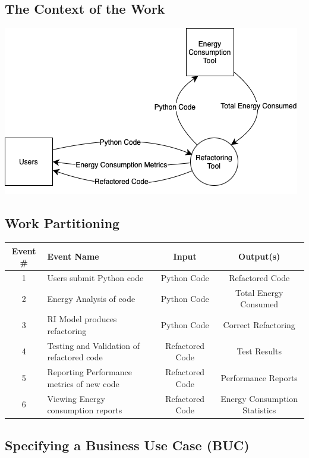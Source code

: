 \documentclass[12pt]{article}
\begin{document}
\subsection{The Context of the Work}

\includegraphics[scale=0.5]{../images/WorkContextModel.png}

\subsection{Work Partitioning}

\begin{tabular}{ |c|p{2.5cm}|c|c| }
  \hline
  Event \# & Event Name & Input & Output(s) \\
  \hline\hline

  1 & Users submit Python code & Python Code & Refactored Code \\
  2 & Energy Analysis of code & Python Code & Total Energy Consumed \\
  3 & RI Model produces refactoring & Python Code & Correct Refactoring \\
  4 & Testing and Validation of refactored code & Refactored Code & Test Results \\
  5 & Reporting Performance metrics of new code & Refactored Code & Performance Reports \\
  6 & Viewing Energy consumption reports & Refactored Code & Energy Consumption Statistics \\

  \hline
\end{tabular}

\subsection{Specifying a Business Use Case (BUC)}
\end{document}
